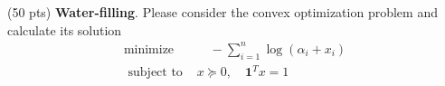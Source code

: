 \item {\color{red} (50 pts)} \textbf{Water-filling}. Please consider the convex optimization problem and calculate its solution
$$
\begin{aligned}
\text {minimize \ \ \ \ \ } & \quad-\sum_{i=1}^n \log \left(\alpha_i+x_i\right) \\
\text { subject to \ \ \ \ \ } & x \succeq 0, \quad \mathbf{1}^T x=1
\end{aligned}
$$

\solution{}







